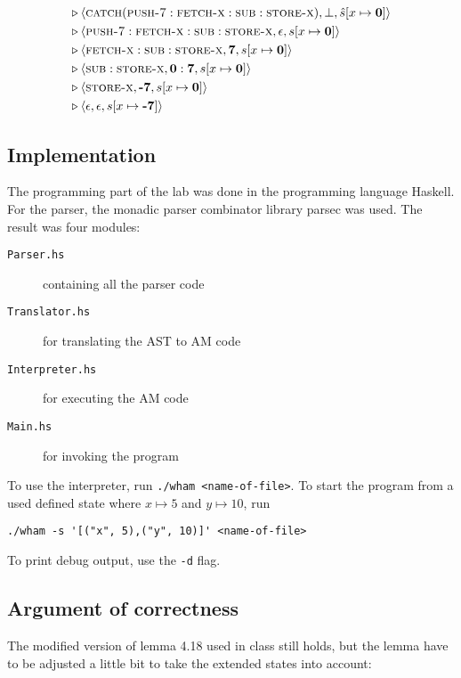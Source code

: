 \documentclass[11pt,oneside,a4paper]{article}
\newcommand{\AMIns}[1]{\textsc{#1}}
\newcommand{\AMConf}[3]{\langle #1, #2, #3 \rangle}
\newcommand{\smap}[2]{[#1 \mapsto \textbf{#2}]}
\begin{document}
\begin{align*}
\triangleright \: &
\AMConf{\AMIns{catch}(\AMIns{push-7}:\AMIns{fetch-x}:\AMIns{sub}:
                     \AMIns{store-x})}{\bot}{\hat{s}\smap{x}{0}} \\
\triangleright \: &
\AMConf{\AMIns{push-7}:\AMIns{fetch-x}:\AMIns{sub}:
                     \AMIns{store-x}}{\epsilon}{s\smap{x}{0}} \\
\triangleright \: &
\AMConf{\AMIns{fetch-x}:\AMIns{sub}:\AMIns{store-x}}{\textbf{7}}{s\smap{x}{0}} \\
\triangleright \: &
\AMConf{\AMIns{sub}:\AMIns{store-x}}{\textbf{0}:\textbf{7}}{s\smap{x}{0}} \\
\triangleright \: &
\AMConf{\AMIns{store-x}}{\textbf{-7}}{s\smap{x}{0}} \\
\triangleright \: &
\AMConf{\epsilon}{\epsilon}{s\smap{x}{-7}} \\
\end{align*}

\subsection*{Implementation}
The programming part of the lab was done in the programming language Haskell. 
For the parser, the monadic parser combinator library parsec was used.
The result was four modules:
\begin{description}
\item[\texttt{Parser.hs}] containing all the parser code
\item[\texttt{Translator.hs}] for translating the AST to AM code
\item[\texttt{Interpreter.hs}] for executing the AM code
\item[\texttt{Main.hs}] for invoking the program
\end{description}
To use the interpreter, run \texttt{./wham <name-of-file>}. To start the 
program from a used defined state where \(x \mapsto 5\) and \(y \mapsto 10\), 
run 
\begin{verbatim} 
./wham -s '[("x", 5),("y", 10)]' <name-of-file>
\end{verbatim}
To print debug output, use the \texttt{-d} flag.

\subsection*{Argument of correctness}
The modified version of lemma 4.18 used in class still holds, 
but the lemma have to be adjusted a little bit to take the 
extended states into account:
\end{document}

